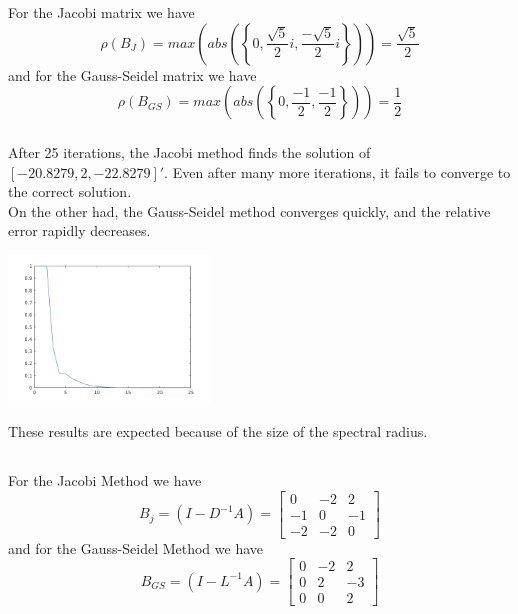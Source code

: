 \documentclass{article}
\begin{document}
\subsubsection{}
For the Jacobi matrix we have
\[\rho(B_J)
= max\left(abs\left(\left\{0,\frac{\sqrt{5}}{2}i,\frac{-\sqrt{5}}{2}i\right\}\right)\right)
= \frac{\sqrt{5}}{2}\]
and for the Gauss-Seidel matrix we have
\[\rho(B_{GS})
= max\left(abs\left(\left\{0,\frac{-1}{2},\frac{-1}{2}\right\}\right)\right)
= \frac{1}{2}\]
\subsubsection{}
After 25 iterations, the Jacobi method finds the solution of
\([-20.8279,2,-22.8279]'\). Even after many more iterations, it fails
to converge to the correct solution.\\
On the other had, the Gauss-Seidel method converges quickly, and the
relative error rapidly decreases.
\begin{center}
  \includegraphics[width=0.4\textwidth]{figures/Question4/Part1/GaussSeidelConvergence}
\end{center}
These results are expected because of the size of the spectral radius.

\subsection{}
\subsubsection{}
For the Jacobi Method we have
\[B_j = (I-D^{-1}A) =
\begin{bmatrix}
   0 & -2  & 2\\
  -1 &  0  &-1\\
  -2 & -2  & 0
\end{bmatrix}
\]
and for the Gauss-Seidel Method we have
\[B_{GS} = (I-L^{-1}A) =
\begin{bmatrix}
  0 & -2 & 2\\
  0 &  2 &-3\\
  0 &  0 & 2
\end{bmatrix}
\]
\end{document}
